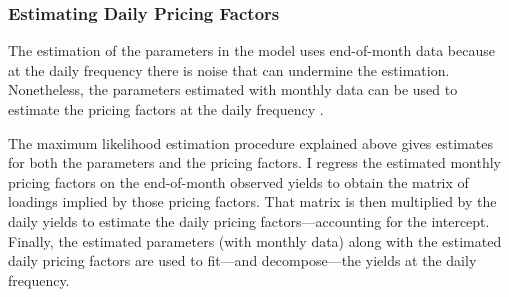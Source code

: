 {%




\subsubsection{Estimating Daily Pricing Factors}
\iftoggle{toclinks}{\gototoc}{} %
The estimation of the parameters in the model uses end-of-month data because at the daily frequency there is noise that can undermine the estimation. 
Nonetheless, the parameters estimated with monthly data can be used to estimate the pricing factors at the daily frequency \citep{ACM:2013}.

The maximum likelihood estimation procedure explained above gives estimates for both the parameters and the pricing factors.
I regress the estimated monthly pricing factors on the end-of-month observed yields to obtain the matrix of loadings implied by those pricing factors.
That matrix is then multiplied by the daily yields to estimate the daily pricing factors---accounting for the intercept.
Finally, the estimated parameters (with monthly data) along with the estimated daily pricing factors are used to fit---and decompose---the yields at the daily frequency.

}
